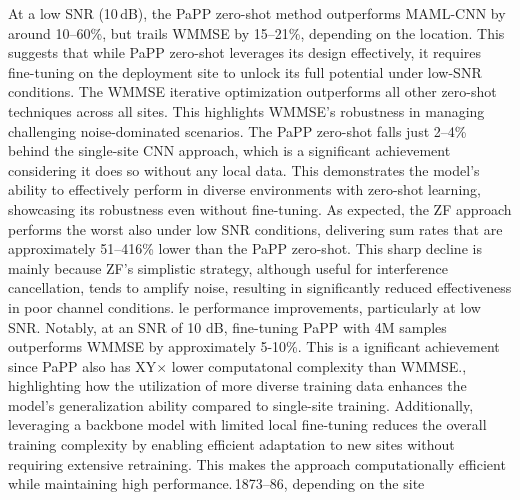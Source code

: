  At a low SNR (10\,dB), the PaPP zero-shot method outperforms MAML-CNN by around 10--60\%, but trails WMMSE by 15--21\%, depending on the location. This suggests that while PaPP zero-shot leverages its design effectively, it requires fine-tuning on the deployment site to unlock its full potential under low-SNR conditions. The WMMSE iterative optimization outperforms all other zero-shot techniques across all sites. This highlights WMMSE's robustness in managing challenging noise-dominated scenarios.
 The PaPP zero-shot falls just 2--4\% behind the single-site CNN approach, which is a significant achievement considering it does so without any local data. This demonstrates the model's ability to effectively perform in diverse environments with zero-shot learning, showcasing its robustness even without fine-tuning.
 As expected, the ZF approach performs the worst also under low SNR conditions, delivering sum rates that are approximately 51--416\% lower than the PaPP zero-shot. This sharp decline is mainly because ZF’s simplistic strategy, although useful for interference cancellation, tends to amplify noise, resulting in significantly reduced effectiveness in poor channel conditions.
le performance improvements, particularly at low SNR. 
Notably, at an SNR of 10 dB, fine-tuning PaPP with 4M samples outperforms WMMSE by approximately 5-10\%. This is a ignificant achievement since PaPP also has XY$\times$ lower computatonal complexity than WMMSE., highlighting how the utilization of more diverse training data enhances the model's generalization ability compared to single-site training. Additionally, leveraging a backbone model with limited local fine-tuning reduces the overall training complexity by enabling efficient adaptation to new sites without requiring extensive retraining. This makes the approach computationally efficient while maintaining high performance.\,1873--86, depending on the site